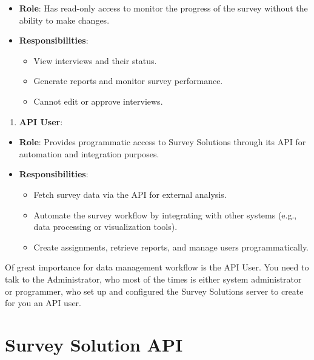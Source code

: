 \documentclass[
  letterpaper,
  DIV=11,
  numbers=noendperiod]{scrreprt}
\providecommand{\tightlist}{%
  \setlength{\itemsep}{0pt}\setlength{\parskip}{0pt}}\usepackage{longtable,booktabs,array}
\begin{document}
\begin{itemize}
\item
  \textbf{Role}: Has read-only access to monitor the progress of the
  survey without the ability to make changes.
\item
  \textbf{Responsibilities}:

  \begin{itemize}
  \item
    View interviews and their status.
  \item
    Generate reports and monitor survey performance.
  \item
    Cannot edit or approve interviews.
  \end{itemize}
\end{itemize}

\begin{enumerate}
\def\labelenumi{\arabic{enumi}.}
\setcounter{enumi}{5}
\tightlist
\item
  \textbf{API User}:
\end{enumerate}

\begin{itemize}
\item
  \textbf{Role}: Provides programmatic access to Survey Solutions
  through its API for automation and integration purposes.
\item
  \textbf{Responsibilities}:

  \begin{itemize}
  \item
    Fetch survey data via the API for external analysis.
  \item
    Automate the survey workflow by integrating with other systems
    (e.g., data processing or visualization tools).
  \item
    Create assignments, retrieve reports, and manage users
    programmatically.
  \end{itemize}
\end{itemize}

Of great importance for data management workflow is the API User. You
need to talk to the Administrator, who most of the times is either
system administrator or programmer, who set up and configured the Survey
Solutions server to create for you an API user.

\section{Survey Solution API}\label{survey-solution-api}
\end{document}
